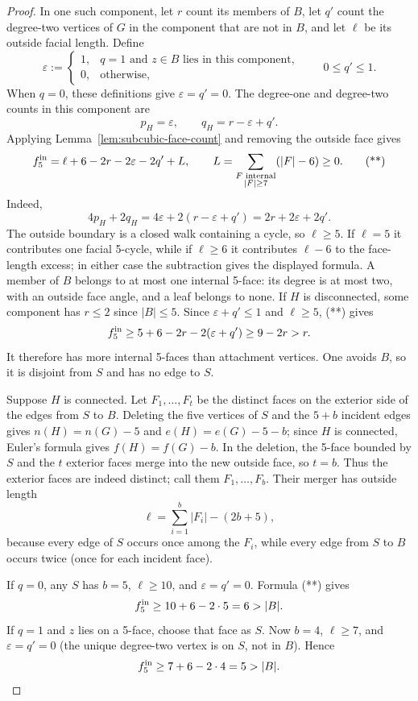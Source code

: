 \documentclass[11pt]{article}
\theoremstyle{remark}
\numberwithin{equation}{section}
\numberwithin{table}{section}
\begin{document}
\begin{proof}
In one such component, let $r$ count its members of $B$, let $q'$
count the degree-two vertices of $G$ in the component that are not in
$B$, and let $\ell$ be its outside facial length.  Define
\[
 \varepsilon:=
 \begin{cases}
  1,&q=1\text{ and $z\in B$ lies in this component},\\
  0,&\text{otherwise},
 \end{cases}
 \qquad 0\le q'\le1.
\]
When $q=0$, these definitions give $\varepsilon=q'=0$.
The degree-one and degree-two counts in this component are
\[
    p_H=\varepsilon,\qquad
    q_H=r-\varepsilon+q'.
\]
Applying Lemma~\ref{lem:subcubic-face-count} and removing the outside
face gives
\[
 f^{\rm in}_5=\ell+6-2r-2\varepsilon-2q'+L,\qquad
 L=\sum_{\substack{F\text{ internal}\\|F|\ge7}}(|F|-6)\ge0.       \tag{**}
\]
Indeed,
\[
4p_H+2q_H=4\varepsilon+2(r-\varepsilon+q')
              =2r+2\varepsilon+2q'.
\]
The outside
boundary is a closed walk containing a cycle, so $\ell\ge5$.  If
$\ell=5$ it contributes one facial 5-cycle, while if $\ell\ge6$ it
contributes $\ell-6$ to the face-length excess; in either case the
subtraction gives the displayed formula.
A member of $B$ belongs to at most one internal 5-face: its degree
is at most two, with an outside face angle, and a leaf belongs to none.
If $H$ is disconnected, some component has $r\le2$ since
$|B|\le5$.  Since $\varepsilon+q'\le1$ and $\ell\ge5$, (**) gives
\[
 f^{\rm in}_5\ge 5+6-2r-2(\varepsilon+q')\ge9-2r>r.
\]
It therefore has more internal 5-faces than attachment vertices.
One avoids $B$, so it is disjoint from $S$ and has no edge to $S$.

Suppose $H$ is connected.  Let $F_1,\ldots,F_t$ be the distinct
faces on the exterior side of the edges from $S$ to $B$.  Deleting
the five vertices of $S$ and the $5+b$ incident edges gives
$n(H)=n(G)-5$ and $e(H)=e(G)-5-b$; since $H$ is connected, Euler's
formula gives $f(H)=f(G)-b$.  In the deletion, the 5-face bounded by
$S$ and the $t$ exterior faces merge into the new outside face, so
$t=b$.  Thus the exterior faces are indeed distinct; call them
$F_1,\ldots,F_b$.  Their merger has outside length
\[
 \ell=\sum_{i=1}^b|F_i|-(2b+5),                       \tag{***}
\]
because every edge of $S$ occurs once among the $F_i$, while every
edge from $S$ to $B$ occurs twice (once for each incident face).

If $q=0$, any $S$ has $b=5$, $\ell\ge10$, and
$\varepsilon=q'=0$.  Formula (**) gives
\[
 f^{\rm in}_5\ge10+6-2\cdot5=6>|B|.
\]
If $q=1$ and $z$ lies on a 5-face, choose that face as $S$. Now $b=4$,
$\ell\ge7$, and $\varepsilon=q'=0$ (the unique degree-two vertex is
on $S$, not in $B$).  Hence
\[
 f^{\rm in}_5\ge7+6-2\cdot4=5>|B|.
\]


\end{proof}
\end{document}
